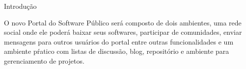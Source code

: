 Introdução

O novo Portal do Software Público será composto de dois ambientes,
uma rede social onde ele poderá baixar seus softwares, participar de comunidades, 
enviar mensagens para outros usuários do portal entre outras funcionalidades e um
ambiente pŕatico com listas de discussão, blog, repositório e ambiente para
gerenciamento de projetos. 


